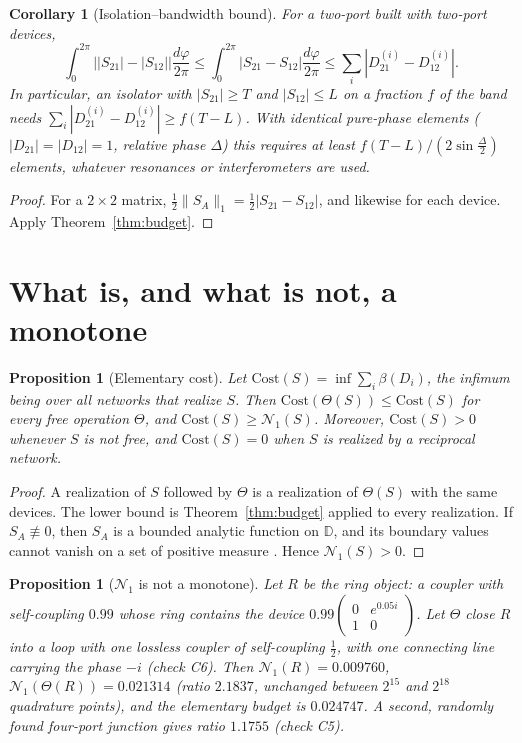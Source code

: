 \documentclass[11pt]{article}
\newtheorem{proposition}[theorem]{Proposition}
\newtheorem{corollary}[theorem]{Corollary}
\theoremstyle{definition}
\theoremstyle{remark}
\newcommand{\NN}{\mathcal N_1}
\newcommand{\D}{\mathbb D}
\begin{document}
\begin{corollary}[Isolation--bandwidth bound]\label{cor:isoband}
For a two-port built with two-port devices,
\[
\int_0^{2\pi}\bigl||S_{21}|-|S_{12}|\bigr|\frac{d\varphi}{2\pi}\le\int_0^{2\pi}|S_{21}-S_{12}|\frac{d\varphi}{2\pi}\le\sum_i|D^{(i)}_{21}-D^{(i)}_{12}|.
\]
In particular, an isolator with $|S_{21}|\ge T$ and $|S_{12}|\le L$ on a fraction $f$ of the band needs $\sum_i|D^{(i)}_{21}-D^{(i)}_{12}|\ge f(T-L)$. With identical pure-phase elements ($|D_{21}|=|D_{12}|=1$, relative phase $\Delta$) this requires at least $f(T-L)/(2\sin\frac\Delta2)$ elements, whatever resonances or interferometers are used.
\end{corollary}
\begin{proof}
For a $2\times2$ matrix, $\frac12\|S_A\|_1=\frac12|S_{21}-S_{12}|$, and likewise for each device. Apply Theorem~\ref{thm:budget}.
\end{proof}

\section{What is, and what is not, a monotone}

\begin{proposition}[Elementary cost]\label{prop:cost}
Let $\mathrm{Cost}(S)=\inf\sum_i\beta(D_i)$, the infimum being over all networks that realize $S$. Then $\mathrm{Cost}(\Theta(S))\le\mathrm{Cost}(S)$ for every free operation $\Theta$, and $\mathrm{Cost}(S)\ge\NN(S)$. Moreover, $\mathrm{Cost}(S)>0$ whenever $S$ is not free, and $\mathrm{Cost}(S)=0$ when $S$ is realized by a reciprocal network.
\end{proposition}
\begin{proof}
A realization of $S$ followed by $\Theta$ is a realization of $\Theta(S)$ with the same devices. The lower bound is Theorem~\ref{thm:budget} applied to every realization. If $S_A\not\equiv0$, then $S_A$ is a bounded analytic function on $\D$, and its boundary values cannot vanish on a set of positive measure \cite{Gar07}. Hence $\NN(S)>0$.
\end{proof}

\begin{proposition}[$\NN$ is not a monotone]\label{prop:notmono}
Let $R$ be the ring object: a coupler with self-coupling $0.99$ whose ring contains the device $0.99\left(\begin{smallmatrix}0&e^{0.05i}\\1&0\end{smallmatrix}\right)$. Let $\Theta$ close $R$ into a loop with one lossless coupler of self-coupling $\frac12$, with one connecting line carrying the phase $-i$ (check C6). Then $\NN(R)=0.009760$, $\NN(\Theta(R))=0.021314$ (ratio $2.1837$, unchanged between $2^{15}$ and $2^{18}$ quadrature points), and the elementary budget is $0.024747$. A second, randomly found four-port junction gives ratio $1.1755$ (check C5).
\end{proposition}
\end{document}
